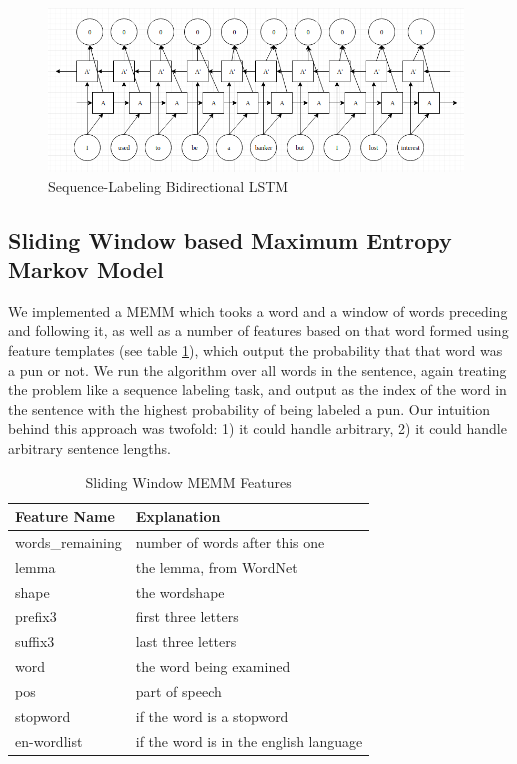 \documentclass{article}
\begin{document}
\begin{figure}[h!]
	\centering
	\includegraphics[width=110mm]{figures/lstm.png}
	\caption{Sequence-Labeling Bidirectional LSTM}
	\label{fig:LSTM}
\end{figure}

\subsection{Sliding Window based Maximum Entropy Markov Model}

We implemented a MEMM which tooks a word and a window of words preceding and
following it, as well as a number of features based on that word formed using
feature templates (see table \ref{tab:memm_features}), which output the probability
that that word was a pun or not. We run the algorithm over all words in the
sentence, again treating the problem like a sequence labeling task, and output
as the index of the word in the sentence with the highest probability of being
labeled a pun. Our intuition behind this approach was twofold: 1) it could
handle arbitrary, 2) it could handle arbitrary sentence lengths. 

\begin{table}
\caption{Sliding Window MEMM Features}\label{tab:memm_features} 
\begin{center}
\begin{tabular}{l l} 
\toprule
\textbf{Feature Name} & \textbf{Explanation} \\
\midrule
words\_remaining      & number of words after this one \\
lemma                 & the lemma, from WordNet \\
shape                 & the wordshape \\
prefix3               & first three letters \\
suffix3               & last three letters \\
word                  & the word being examined \\
pos                   & part of speech \\
stopword              & if the word is a stopword \\
en-wordlist           & if the word is in the english language \\
\bottomrule
\end{tabular}
\end{center}
\end{table}
\end{document}
